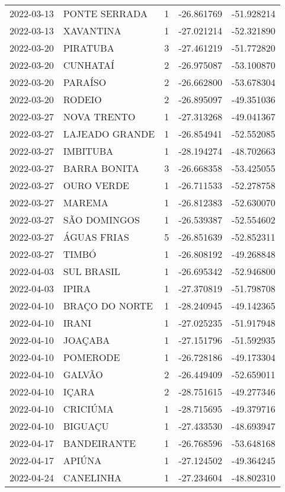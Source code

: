 \documentclass[
	12pt,				%
	openright,			%
	oneside,			%
	a4paper,			%
	english,			%
	french,				%
	spanish,			%
	brazil				%
	dvipsnames, table]{abntex2}
\begin{document}
\begin{longtable}[htbp]{llcrr}
2022-03-13 & PONTE SERRADA & 1 & -26.861769 & -51.928214 \\
2022-03-13 & XAVANTINA & 1 & -27.021214 & -52.321890 \\
2022-03-20 & PIRATUBA & 3 & -27.461219 & -51.772820 \\
2022-03-20 & CUNHATAÍ & 2 & -26.975087 & -53.100870 \\
2022-03-20 & PARAÍSO & 2 & -26.662800 & -53.678304 \\
2022-03-20 & RODEIO & 2 & -26.895097 & -49.351036 \\
2022-03-27 & NOVA TRENTO & 1 & -27.313268 & -49.041367 \\
2022-03-27 & LAJEADO GRANDE & 1 & -26.854941 & -52.552085 \\
2022-03-27 & IMBITUBA & 1 & -28.194274 & -48.702663 \\
2022-03-27 & BARRA BONITA & 3 & -26.668358 & -53.425055 \\
2022-03-27 & OURO VERDE & 1 & -26.711533 & -52.278758 \\
2022-03-27 & MAREMA & 1 & -26.812383 & -52.630070 \\
2022-03-27 & SÃO DOMINGOS & 1 & -26.539387 & -52.554602 \\
2022-03-27 & ÁGUAS FRIAS & 5 & -26.851639 & -52.852311 \\
2022-03-27 & TIMBÓ & 1 & -26.808192 & -49.268848 \\
2022-04-03 & SUL BRASIL & 1 & -26.695342 & -52.946800 \\
2022-04-03 & IPIRA & 1 & -27.370819 & -51.798708 \\
2022-04-10 & BRAÇO DO NORTE & 1 & -28.240945 & -49.142365 \\
2022-04-10 & IRANI & 1 & -27.025235 & -51.917948 \\
2022-04-10 & JOAÇABA & 1 & -27.151796 & -51.592935 \\
2022-04-10 & POMERODE & 1 & -26.728186 & -49.173304 \\
2022-04-10 & GALVÃO & 2 & -26.449409 & -52.659011 \\
2022-04-10 & IÇARA & 2 & -28.751615 & -49.277346 \\
2022-04-10 & CRICIÚMA & 1 & -28.715695 & -49.379716 \\
2022-04-10 & BIGUAÇU & 1 & -27.433530 & -48.693947 \\
2022-04-17 & BANDEIRANTE & 1 & -26.768596 & -53.648168 \\
2022-04-17 & APIÚNA & 1 & -27.124502 & -49.364245 \\
2022-04-24 & CANELINHA & 1 & -27.234604 & -48.802310 \\

\end{longtable}
\end{document}
